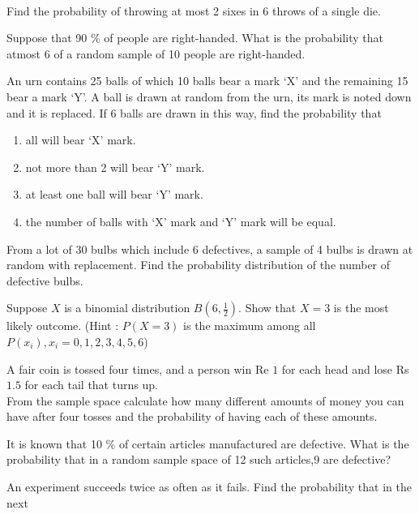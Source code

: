 \\
\solution
\item Find the probability of throwing at most 2 sixes in 6 throws of a single die.\\
\solution
\item Suppose that 90 \% of people are right-handed. What is the probability that atmost 6 of a random sample of 10 people are right-handed. 
\\
\solution
  \item An urn contains 25 balls of which 10 balls bear a mark `X' and the 
    remaining 15 bear a mark `Y'. A ball is drawn at random from the urn, its 
    mark is noted down and it is replaced. If 6 balls are drawn in this way, 
    find the probability that 
    \begin{enumerate}
        \item all will bear `X' mark. 
        \item not more than 2 will bear `Y' mark. 
        \item at least one ball will bear `Y' mark. 
        \item the number of balls with `X' mark and `Y' mark will be equal.
    \end{enumerate}
\solution
\item From a lot of 30 bulbs which include 6 defectives, a sample of 4 bulbs is drawn
at random with replacement. Find the probability distribution of the number of
defective bulbs.\\
\solution

 \item Suppose $X$ is a binomial distribution $B\left(6,\frac{1}{2}\right)$. Show that $X=3$ is the most likely outcome.
(Hint : $P(X=3)$ is the maximum among all $P(x_i),x_i=0,1,2,3,4,5,6$)\\
\solution

\item A fair coin is tossed four times, and a person win Re $1$ for each head and lose Rs $1.5$ for each tail that turns up.\\
From the sample space calculate how many different amounts of money you can have after four tosses and the probability of having each of these amounts.
\solution
\item It is known that 10 $\%$ of certain articles manufactured are defective. What is the probability that in a random sample space of 12 such articles,9 are defective? \\
\solution

\item An experiment succeeds twice as often as it fails. Find the probability that in the next
